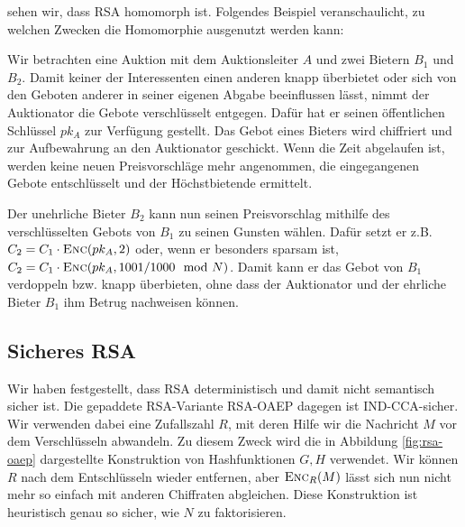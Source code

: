 \begin{description}
    sehen wir, dass RSA homomorph ist. 
    Folgendes Beispiel veranschaulicht, zu welchen Zwecken die Homomorphie ausgenutzt werden kann:
    \begin{beispiel}
    	Wir betrachten eine Auktion mit dem Auktionsleiter $A$ und zwei Bietern $B_1$ und $B_2$. Damit keiner der Interessenten einen
    	anderen knapp überbietet oder sich von den Geboten anderer in seiner eigenen Abgabe beeinflussen lässt, nimmt der Auktionator die Gebote verschlüsselt entgegen. Dafür hat er seinen öffentlichen Schlüssel $pk_A$ zur Verfügung gestellt. Das Gebot eines Bieters wird chiffriert und zur Aufbewahrung an den Auktionator geschickt. Wenn die Zeit abgelaufen ist, werden keine neuen Preisvorschläge mehr angenommen, die eingegangenen Gebote entschlüsselt und der Höchstbietende ermittelt.
    
    	Der unehrliche Bieter $B_2$ kann nun seinen Preisvorschlag mithilfe des verschlüsselten Gebots von $B_1$ zu seinen Gunsten wählen. Dafür setzt er z.B. $C_2 =
    	C_1 \cdot \textsc{Enc}({pk_A, 2})$ oder, wenn er besonders sparsam ist, $C_2 = C_1 \cdot \textsc{Enc}({pk_A, 1001/1000 \mod N})$. Damit kann er das Gebot von $B_1$ verdoppeln
    	bzw. knapp überbieten, ohne dass der Auktionator und der ehrliche Bieter $B_1$ ihm Betrug nachweisen können.
    \end{beispiel}
    
    
%    
%    
%    
%    
\end{description} 

\subsection{Sicheres RSA}
Wir haben festgestellt, dass RSA deterministisch und damit nicht semantisch sicher ist. Die gepaddete RSA-Variante RSA-OAEP dagegen ist IND-CCA-sicher. Wir
verwenden dabei eine Zufallszahl $R$, mit deren Hilfe wir die Nachricht $M$ vor dem Verschlüsseln abwandeln. Zu diesem Zweck wird die in Abbildung
\ref{fig:rsa-oaep} dargestellte Konstruktion von Hashfunktionen $G, H$ verwendet. Wir können $R$ nach dem Entschlüsseln wieder entfernen, aber $\textsc{Enc}_R(M)$
lässt sich nun nicht mehr so einfach mit anderen Chiffraten abgleichen.
Diese Konstruktion ist heuristisch genau so sicher, wie $N$ zu faktorisieren.

